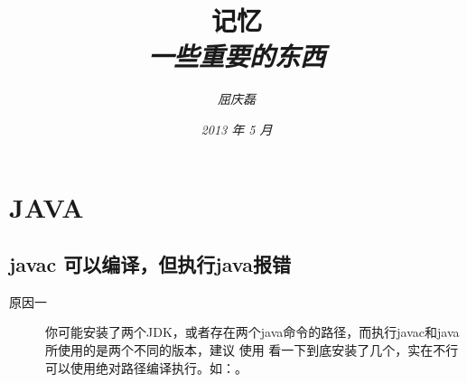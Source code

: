 \documentclass{article}
\begin{document}
\title{%
  {\huge \textsf{记忆}\\\smallskip}%
  {\small \textit{一些重要的东西}}
}

\author{\textit{屈庆磊}\\[2mm]
       }

\date{\textit{2013 年 5 月}}

\maketitle
\newpage
\begin{multicols}{2}
\tableofcontents
\end{multicols}
\newpage 

\section{JAVA}
\subsection{javac 可以编译，但执行java报错}
\begin{description}
\item[原因一] 你可能安装了两个JDK，或者存在两个java命令的路径，而执行javac和java所使用的是两个不同的版本，建议
使用 看一下到底安装了几个，实在不行可以使用绝对路径编译执行。如：。
\end{description}
\end{document}
